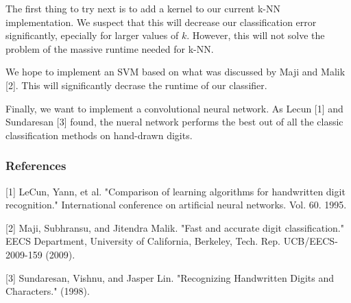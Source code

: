 \documentclass{article} %
\begin{document}
The first thing to try next is to add a kernel to our current k-NN
implementation. We suspect that this will decrease our classification error
significantly, epecially for larger values of $k$. However, this will not solve
the problem of the massive runtime needed for k-NN.

We hope to implement an SVM based on what was discussed by Maji and Malik [2].
This will significantly decrase the runtime of our classifier.

Finally, we want to implement a convolutional neural network. As Lecun [1] and
Sundaresan [3] found,
the nueral network performs the best out of all the classic classification
methods on hand-drawn digits.


\subsubsection*{References}

\small{
  [1] LeCun, Yann, et al. "Comparison of learning algorithms for handwritten
  digit recognition." International conference on artificial neural networks.
  Vol. 60. 1995.	

  [2] Maji, Subhransu, and Jitendra Malik. "Fast and accurate digit
  classification." EECS Department, University of California,
  Berkeley, Tech. Rep. UCB/EECS-2009-159 (2009).

  [3] Sundaresan, Vishnu, and Jasper Lin. "Recognizing Handwritten Digits and
  Characters." (1998).
}
\end{document}
